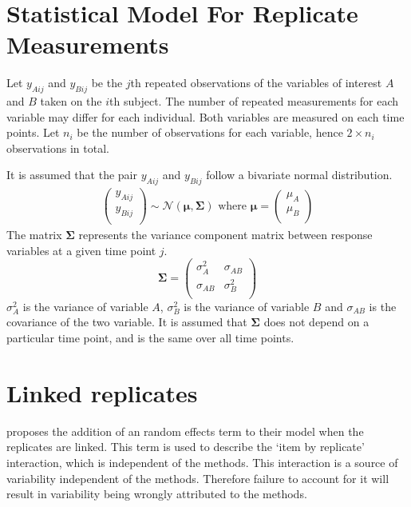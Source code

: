 \documentclass[12pt, a4paper]{report}
\theoremstyle{plain}
\theoremstyle{definition}
\theoremstyle{remark}
\begin{document}
	
	
	
		\section{Statistical Model For Replicate Measurements}
	Let $y_{Aij}$ and $y_{Bij}$ be the $j$th repeated observations of the variables of interest $A$ and $B$ taken on the $i$th subject. The number of repeated measurements for each variable may differ for each individual.
	Both variables are measured on each time points. Let $n_{i}$ be the number of observations for each variable, hence $2\times n_{i}$ observations in total.
	
	It is assumed that the pair $y_{Aij}$ and $y_{Bij}$ follow a bivariate normal distribution.
	\begin{eqnarray}
	\left(
	\begin{array}{c}
	y_{Aij} \\
	y_{Bij} \\
	\end{array}
	\right) \sim \mathcal{N}(
	\boldsymbol{\mu}, \boldsymbol{\Sigma})\mbox{   where } \boldsymbol{\mu} = \left(
	\begin{array}{c}
	\mu_{A} \\
	\mu_{B} \\
	\end{array}
	\right)
	\end{eqnarray}
	The matrix $\boldsymbol{\Sigma}$ represents the variance component matrix between response variables at a given time point $j$.
	\begin{equation}
	\boldsymbol{\Sigma} = \left( \begin{array}{cc}
	\sigma^2_{A} & \sigma_{AB} \\
	\sigma_{AB} & \sigma^2_{B}\\
	\end{array}\right)
	\end{equation}
	$\sigma^2_{A}$ is the variance of variable $A$, $\sigma^2_{B}$ is the variance of variable $B$ and $\sigma_{AB}$ is the covariance of the two variable. It is assumed that $\boldsymbol{\Sigma}$ does not depend on a particular time point, and is the same over all time points.
	
	


	\section{Linked replicates}
	
	\citet{BXC2008} proposes the addition of an random effects term to their model when the replicates are linked. This term is used to describe the `item by replicate' interaction, which is independent of the methods. This interaction is a source of variability independent of the methods. Therefore failure to account for it will result in variability being wrongly attributed to the methods.
	
\end{document}
